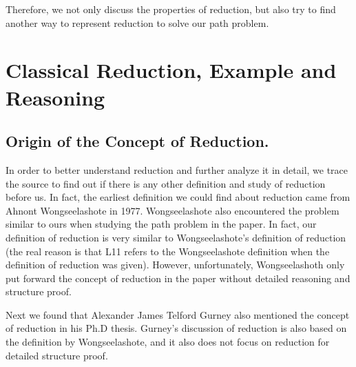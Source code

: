 \documentclass[a4paper,10pt]{article}
\begin{document}
Therefore, we not only discuss the properties of reduction, but also try to find another way to represent reduction to solve our path problem.
\section{Classical Reduction, Example and Reasoning}
\subsection{Origin of the Concept of Reduction.}
In order to better understand reduction and further analyze it in detail, we trace the source to find out if there is any other definition and study of reduction before us. 
In fact, the earliest definition we could find about reduction came from Ahnont Wongseelashote in 1977\cite{WONGSEELASHOTE197955}. Wongseelashote also encountered the problem similar to ours when studying the path problem in the paper. In fact, our definition of reduction is very similar to Wongseelashote's definition of reduction (the real reason is that L11 refers to the Wongseelashote definition when the definition of reduction was given). However, unfortunately, Wongseelashoth only put forward the concept of reduction in the paper without detailed reasoning and structure proof.

Next we found that Alexander James Telford Gurney also mentioned the concept of reduction in his Ph.D thesis\cite{gurney_construction_2010}. Gurney's discussion of reduction is also based on the definition by Wongseelashote, and it also does not focus on reduction for detailed structure proof.
\end{document}
